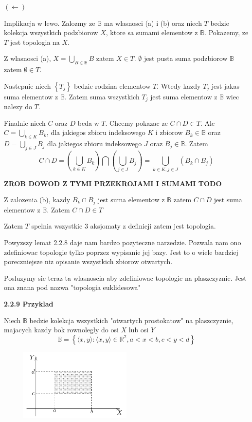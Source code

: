 \documentclass{article}
\begin{document}
$(\leftarrow)$

Implikacja w lewo. Zalozmy ze $\mathbb{B}$ ma wlasnosci (a) i (b) oraz niech $T$ bedzie kolekcja wszystkich podzbiorow $X$, ktore sa sumami elementow z $\mathbb{B}$. Pokazemy, ze $T$ jest topologia na $X$.

Z wlasnosci (a), $X = \bigcup\limits_{B \in \mathbb{B}}B$ zatem  $X \in T$. $\emptyset$ jest pusta suma podzbiorow $\mathbb{B}$ zatem $\emptyset \in T$.

Nastepnie niech $\left\{ T_{j} \right\}$ bedzie rodzina elementow $T$. Wtedy kazdy $T_{j}$ jest jakas suma elementow z $\mathbb{B}$. Zatem suma wszystkich $T_{j}$ jest suma elementow z $\mathbb{B}$ wiec nalezy do $T$.

Finalnie niech $C$ oraz $D$ beda w $T$. Chcemy pokazac ze $C \cap D \in T$. Ale $C = \bigcup\limits_{k \in K}B_{k}$, dla jakiegos zbioru indeksowego $K$ i zbiorow $B_{k} \in \mathbb{B}$ oraz $D = \bigcup\limits_{j \in J}B_{j}$ dla jakiegos zbioru indeksowego $J$ oraz $B_{j} \in \mathbb{B}$. Zatem $$ C \cap D = \left(\bigcup\limits_{k \in K}B_{k}\right) \bigcap \left( \bigcup\limits_{j \in J}B_{j} \right) = \bigcup\limits_{k \in K, j \in J}(B_{k} \cap B_{j})$$

\textbf{ZROB DOWOD Z TYMI PRZEKROJAMI I SUMAMI TODO}

Z zalozenia (b), kazdy $B_{k} \cap B_{j}$ jest suma elementow z $\mathbb{B}$ zatem $C \cap D$ jest suma elementow z $\mathbb{B}$. Zatem $C \cap D \in T$ 

Zatem $T$ spelnia wszystkie 3 aksjomaty z definicji zatem jest topologia.

\vspace{1cm}

Powyzszy lemat 2.2.8 daje nam bardzo pozyteczne narzedzie. Pozwala nam ono zdefiniowac topologie tylko poprzez wypisanie jej bazy. Jest to o wiele bardziej poreczniejsze niz opisanie wszystkich zbiorow otwartych.

Posluzymy sie teraz ta wlasnoscia aby zdefiniowac topologie na plaszczyznie. Jest ona znana pod nazwa "topologia euklidesowa"

\textbf{2.2.9 Przyklad}

Niech $\mathbb{B}$ bedzie kolekcja wszystkich "otwartych prostokatow" na plaszczyznie, majacych kazdy bok rownolegly do osi $X$ lub osi $Y$
$$\mathbb{B} = \left\{ \langle x,y \rangle : \langle x,y \rangle \in \mathbb{R}^{2}, a<x<b, c<y<d   \right\}$$

\begin{figure}[h]
    \centering
    \includegraphics[width=0.5\textwidth]{rectangle2_2_9.png}
\end{figure}
\end{document}
